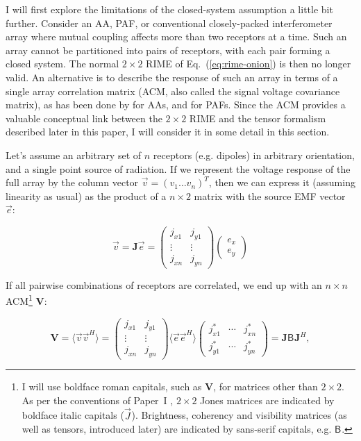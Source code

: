\documentclass[]{aa}
\newcommand{\herm}{H}
\newcommand{\jones}[2]{\vec {#1}_{#2}}
\newcommand{\coh}[2]{\mathsf{{#1}}_{{#2}}}
\begin{document}
I will first explore the limitations of the closed-system assumption a little bit further. Consider an AA, PAF, or conventional closely-packed interferometer array where mutual coupling affects more than two receptors at a time. Such an array cannot be partitioned into pairs of receptors, with each pair forming a closed system. The normal $2\times2$ RIME of Eq.~(\ref{eq:rime-onion}) is then no longer valid. An alternative is to describe the response of such an array in terms of a single array correlation matrix (ACM, also called the signal voltage covariance matrix), as has been done by \citet{wijnholds-thesis} for AAs, and \citet{warnick-paf-polarimetry} for PAFs. Since the ACM provides a valuable conceptual link between the $2\times2$ RIME and the tensor formalism described later in this paper, I will consider it in some detail in this section.

Let's assume an arbitrary set of $n$ receptors (e.g. dipoles) in arbitrary orientation, and a single point source of radiation. 
If we represent the voltage response of the full array by the column vector $\vec{v}=(v_{1}\ldots v_{n})^T$, then we can express it (assuming linearity as usual) as the product of a $n\times2$ matrix with the source EMF vector $\vec e$:

\[
\vec{v} = \mathbf{J}\vec e = \left(\begin{array}{cc}
j_{x1} & j_{y1}\\
\vdots & \vdots\\
j_{xn} & j_{yn}\end{array}\right)
\left(\begin{array}{c} e_x\\e_y
\end{array}\right)
\]

If all pairwise combinations of receptors are correlated, we end up with an $n\times n$ ACM\footnote{I will use boldface roman capitals, such as $\mathbf{V}$, for matrices other than $2\times2$. As per the conventions of Paper~I \citep[][Sect.~1.4]{RRIME1}, $2\times2$ Jones matrices are indicated by boldface italic capitals ($\jones{J}{}$). Brightness, coherency and visibility matrices (as well as tensors, introduced later) are indicated by sans-serif capitals, e.g. $\coh{B}{}$.} $\mathbf{V}$:

\begin{equation}\label{eq:array-response-j}
\mathbf{V} =\langle \vec v \vec v^\herm \rangle =\left(\begin{array}{cc}
j_{x1} & j_{y1}\\
\vdots & \vdots\\
j_{xn} & j_{yn}\end{array}\right) \langle \vec e \vec e^\herm \rangle \left(\begin{array}{ccc}
j^*_{x1} & \cdots & j^*_{xn}\\
j^*_{y1} & \cdots & j^*_{yn}\end{array}\right)= \mathbf{J} \coh{B}{} \mathbf{J}^\herm,
\end{equation}
\end{document}
